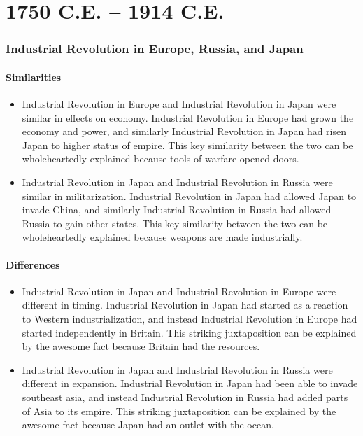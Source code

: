 \documentclass[letterpaper, 10pt]{article}
\begin{document}
    \part{1750 C.E. -- 1914 C.E.}
        \section{Industrial Revolution in Europe, Russia, and Japan}
            \subsection{Similarities}
                \begin{itemize}
                    \item Industrial Revolution in Europe and Industrial Revolution in Japan were similar in effects on economy. Industrial Revolution in Europe had grown the economy and power, and similarly Industrial Revolution in Japan had risen Japan to higher status of empire. This key similarity between the two can be wholeheartedly explained because tools of warfare opened doors.
                    \item Industrial Revolution in Japan and Industrial Revolution in Russia were similar in militarization. Industrial Revolution in Japan had allowed Japan to invade China, and similarly Industrial Revolution in Russia had allowed Russia to gain other states. This key similarity between the two can be wholeheartedly explained because weapons are made industrially.
                \end{itemize}
            \subsection{Differences}
                \begin{itemize}
                    \item Industrial Revolution in Japan and Industrial Revolution in Europe were different in timing. Industrial Revolution in Japan had started as a reaction to Western industrialization, and instead Industrial Revolution in Europe had started independently in Britain. This striking juxtaposition can be explained by the awesome fact because Britain had the resources.
                    \item Industrial Revolution in Japan and Industrial Revolution in Russia were different in expansion. Industrial Revolution in Japan had been able to invade southeast asia, and instead Industrial Revolution in Russia had added parts of Asia to its empire. This striking juxtaposition can be explained by the awesome fact because Japan had an outlet with the ocean.
                \end{itemize}
\end{document}

